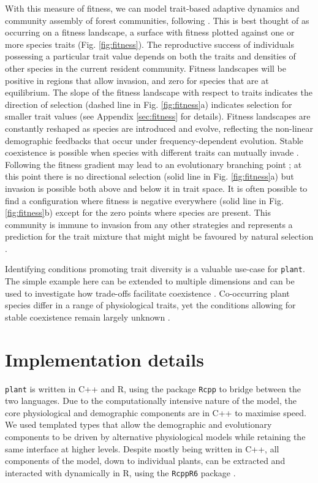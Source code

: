 \documentclass[a4paper,11pt]{article}
\newcommand{\plant}{\texttt{plant}}
\begin{document}
With this measure of fitness, we can model trait-based adaptive
dynamics and community assembly of forest communities, following
 \citep{Falster-2015}. This is best
thought of as occurring on a fitness landscape, a surface with fitness
plotted against one or more species traits
(Fig. \ref{fig:fitness}). The reproductive success of individuals
possessing a particular trait value depends on both the traits and
densities of other species in the current resident community. Fitness
landscapes will be positive in regions that allow invasion, and zero
for species that are at equilibrium. The slope of the fitness
landscape with respect to traits indicates the direction of selection
(dashed line in Fig. \ref{fig:fitness}a) indicates selection for
smaller trait values (see Appendix \ref{sec:fitness} for
details). Fitness landscapes are constantly reshaped as species are
introduced and evolve, reflecting the non-linear demographic feedbacks
that occur under frequency-dependent evolution. Stable coexistence is
possible when species with different traits can mutually invade
\citep{Geritz-1998, Chesson-2000}. Following the fitness gradient may lead to an
evolutionary branching point \citep{Geritz-1998}; at
this point there is no directional selection (solid line in
Fig. \ref{fig:fitness}a) but invasion is possible both above and below
it in trait space. It is often possible to find a configuration where
fitness is negative everywhere (solid line in Fig. \ref{fig:fitness}b)
except for the zero points where species are present. This community
is immune to invasion from any other strategies and represents a
prediction for the trait mixture that might might be favoured by
natural selection \citep{Geritz-1998}.

Identifying conditions promoting trait diversity is a valuable use-case
for {\plant}. The simple example here can be extended to multiple dimensions
and can be used to investigate how trade-offs facilitate coexistence
\citep{Falster-2015}. Co-occurring plant species differ in a range of physiological
traits, yet the conditions allowing for stable coexistence remain largely
unknown \citep{Adler-2013}. 

\section{Implementation details}

{\plant} is written in C++ and R, using the package \texttt{Rcpp}
\citep{Eddelbuettel-2011, Eddelbuettel-2013} to bridge between the two
languages. Due to the computationally intensive nature of the model,
the core physiological and demographic components are in C++ to
maximise speed. We used templated types that allow the demographic and
evolutionary components to be driven by alternative physiological
models while retaining the same interface at higher levels. Despite
mostly being written in C++, all components of the model, down to
individual plants, can be extracted and interacted with dynamically in
R, using the \texttt{RcppR6} package \citep{RcppR6}.
\end{document}
